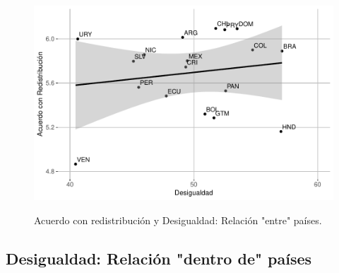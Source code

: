 \documentclass[12pt,letterpaper]{article}
\begin{document}
\begin{center}
	\begin{figure}[H]
		\caption[Acuerdo con redistribución y Desigualdad: Relación "entre" países.]{Acuerdo con redistribución y Desigualdad: Relación "entre" países.}
		\includegraphics[width=1\textwidth]{G4a.pdf}
		\label{fig:g5}
	\end{figure}
\end{center}

\newpage


\subsection{Desigualdad: Relación "dentro de" países \label{sec:sec63}}
\end{document}
